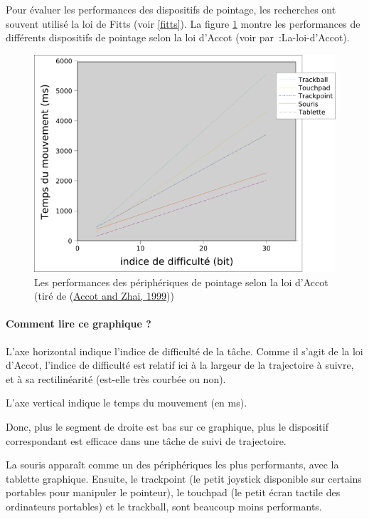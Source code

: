 \documentclass[
]{book}
\begin{document}
Pour évaluer les performances des dispositifs de pointage, les recherches
ont souvent utilisé la loi de Fitts (voir \ref{fitts}). La
figure \ref{fig:accot} montre les performances de différents
dispositifs de pointage selon la loi d'Accot (voir par~:La-loi-d'Accot).

\begin{figure}
\centering
\includegraphics{img/steering.png}
\caption{\label{fig:accot}Les performances des périphériques de pointage selon la loi d'Accot (tiré
de (\protect\hyperlink{ref-accot1999performance}{Accot and Zhai, 1999}))}
\end{figure}

\hypertarget{comment-lire-ce-graphique}{%
\paragraph*{Comment lire ce graphique ?}\label{comment-lire-ce-graphique}}

L'axe horizontal indique l'indice de difficulté de la tâche. Comme il
s'agit de la loi d'Accot, l'indice de difficulté est relatif ici à la largeur
de la trajectoire à suivre, et à sa rectilinéarité (est-elle très courbée ou
non).

L'axe vertical indique le temps du mouvement (en ms).

Donc, plus le segment de droite est bas sur ce graphique, plus le
dispositif correspondant est efficace dans une tâche de suivi de
trajectoire.

La souris apparaît comme un des périphériques les plus performants, avec
la tablette graphique. Ensuite, le trackpoint (le petit joystick disponible
sur certains portables pour manipuler le pointeur), le touchpad (le petit
écran tactile des ordinateurs portables) et le trackball, sont beaucoup moins
performants.
\end{document}
